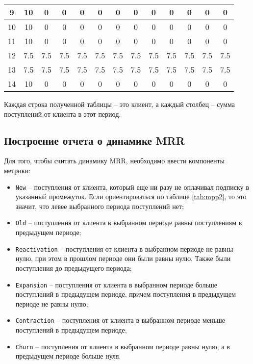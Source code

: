 \begin{table}[H]
{\begin{tabular}{|c|c|c|c|c|c|c|c|c|c|c|c|c|}
			9         & 10      & 0       & 0       & 0       & 0       & 0       & 0       & 0       & 0       & 0       & 0       & 0       \\ \hline
			10        & 10      & 0       & 0       & 0       & 0       & 0       & 0       & 0       & 0       & 0       & 0       & 0       \\ \hline
			11        & 10      & 0       & 0       & 0       & 0       & 0       & 0       & 0       & 0       & 0       & 0       & 0       \\ \hline
			12        & 7.5     & 7.5     & 7.5     & 7.5     & 7.5     & 7.5     & 7.5     & 7.5     & 7.5     & 7.5     & 7.5     & 7.5     \\ \hline
			13        & 7.5     & 7.5     & 7.5     & 7.5     & 7.5     & 7.5     & 7.5     & 7.5     & 7.5     & 7.5     & 7.5     & 7.5     \\ \hline
			14        & 10      & 0       & 0       & 0       & 0       & 0       & 0       & 0       & 0       & 0       & 0       & 0       \\ \hline
		\end{tabular}%
	}
\end{table}

Каждая строка полученной таблицы -- это клиент, а каждый столбец -- сумма поступлений от клиента в этот период.

\subsection{Построение отчета о динамике MRR}

Для того, чтобы считать динамику MRR, необходимо ввести компоненты метрики:

\begin{itemize}
	\item \texttt{New} -- поступления от клиента, который еще ни разу не оплачивал подписку в указанный промежуток. Если ориентироваться по таблице \ref{tab:mpp2}, то это значит, что левее выбранного периода поступлений нет;
	\item \texttt{Old} -- поступления от клиента в выбранном периоде равны поступлениям в предыдущем периоде;
	\item \texttt{Reactivation} -- поступления от клиента в выбранном периоде не равны нулю, при этом в прошлом периоде они были равны нулю. Также были поступления до предыдущего периода;
	\item \texttt{Expansion} -- поступления от клиента в выбранном периоде больше поступлений в предыдущем периоде, причем поступления в предыдущем периоде не равны нулю;
	\item \texttt{Contraction} -- поступления от клиента в выбранном периоде меньше поступлений в предыдущем периоде;
	\item \texttt{Churn} -- поступления от клиента в выбранном периоде равны нулю, а в предыдущем периоде больше нуля.
\end{itemize}

